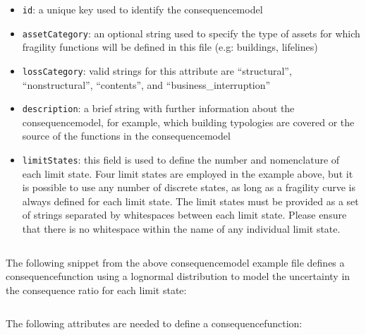 \begin{itemize}

    \item \Verb+id+: a unique key used to identify the \gls{consequencemodel}

    \item \Verb+assetCategory+: an optional string used to specify the type of
    \glspl{asset} for which fragility functions will be defined in this file 
    (e.g: buildings, lifelines)

    \item \Verb+lossCategory+: valid strings for this attribute are 
    ``structural'', ``nonstructural'', ``contents'', and 
    ``business\_interruption''

    \item \Verb+description+: a brief string with further information about the
    \gls{consequencemodel}, for example, which building typologies are covered or 
    the source of the functions in the \gls{consequencemodel}

    \item \Verb+limitStates+: this field is used to define the number and 
    nomenclature of each limit state. Four limit states are employed in the 
    example above, but it is possible to use any number of discrete states,
    as long as a fragility curve is always defined for each limit state. The 
    limit states must be provided as a set of strings separated by whitespaces 
    between each limit state. Please ensure that there is no whitespace within 
    the name of any individual limit state.

\end{itemize}

\inputminted[firstline=4,firstnumber=4,lastline=9,fontsize=\footnotesize,frame=single,linenos,bgcolor=lightgray]{xml}{oqum/risk/Verbatim/input_consequence.xml}

The following snippet from the above \gls{consequencemodel} example file defines a
\gls{consequencefunction} using a lognormal distribution to model the uncertainty
in the consequence ratio for each limit state:

\inputminted[firstline=11,firstnumber=11,lastline=16,fontsize=\footnotesize,frame=single,linenos,bgcolor=lightgray]{xml}{oqum/risk/Verbatim/input_consequence.xml}

The following attributes are needed to define a \gls{consequencefunction}:

